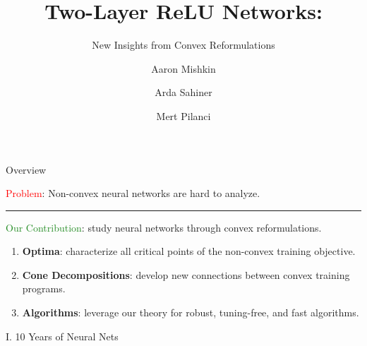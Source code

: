 \documentclass[usenames,dvipsnames,mathserif,notheorems]{beamer}
\title{Two-Layer ReLU Networks:}
\subtitle{New Insights from Convex Reformulations}
\author{Aaron Mishkin \and Arda Sahiner \and Mert Pilanci}
\date{}
\newcommand{\horizontalrule}{
	{
			\vspace{-0.5em}
			\center \rule{\textwidth}{0.1em}
			\vspace{-0.2em}
		}
}
\newcommand{\red}[1]{\textcolor{Red}{#1}}
\newcommand{\green}[1]{\textcolor{ForestGreen}{#1}}
\begin{document}
\maketitle

\begin{frame}{Overview}

	{
		\large \red{Problem}: Non-convex neural networks are hard to analyze.
	}

	\pause
	\vspace{0.5em}
	\horizontalrule
	\vspace{0.5em}

	{
		\large \green{Our Contribution}: study neural networks through convex reformulations.
	}

	\pause
	\vspace{0.5em}

	\begin{enumerate}
		\item \textbf{Optima}: characterize all critical points of the non-convex training objective.\pause

		\item \textbf{Cone Decompositions}: develop new connections between convex training programs.\pause

		\item \textbf{Algorithms}: leverage our theory for robust, tuning-free, and fast algorithms.
	\end{enumerate}

\end{frame}


\begin{frame}{}
	\begin{center}
		\huge I. 10 Years of Neural Nets
	\end{center}
\end{frame}
\end{document}
